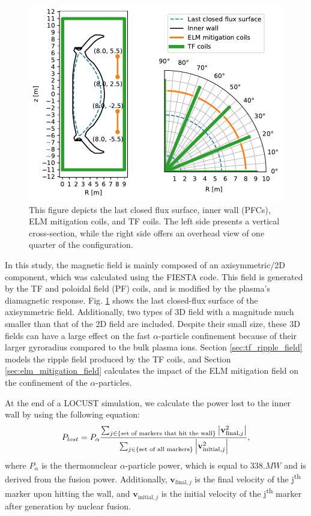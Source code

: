 \documentclass[10pt, a4paper, twoside]{article}
\begin{document}
\begin{figure}[!htb]
    \centering
    \includegraphics[width=0.6\linewidth]{Figures/lcfs_wall_elm_tf_coils.pdf}
    \caption{This figure depicts the last closed flux surface, inner wall (PFCs), ELM mitigation coils, and TF coils. The left side presents a vertical cross-section, while the right side offers an overhead view of one quarter of the configuration.}
    \label{fig:lcfs_wall_elm_tf_coils}
\end{figure}

In this study, the magnetic field is mainly composed of an axisymmetric/2D component, which was calculated using the FIESTA code. This field is generated by the TF and poloidal field (PF) coils, and is modified by the plasma's diamagnetic response. Fig. \ref{fig:lcfs_wall_elm_tf_coils} shows the last closed-flux surface of the axisymmetric field. Additionally, two types of 3D field with a magnitude much smaller than that of the 2D field are included. Despite their small size, these 3D fields can have a large effect on the fast $\alpha$-particle confinement because of their larger gyroradius compared to the bulk plasma ions. Section \ref{sec:tf_ripple_field} models the ripple field produced by the TF coils, and Section \ref{sec:elm_mitigation_field} calculates the impact of the ELM mitigation field on the confinement of the $\alpha$-particles.

At the end of a LOCUST simulation, we calculate the power lost to the inner wall by using the following equation: 
\begin{equation} 
P_{lost} = P_\alpha \frac{\sum_{j\in \text{\{set of markers that hit the wall\}}}\abs{\textbf{v}_{\text{final}, j}^2}}{\sum_{j \in \{\text{set of all markers}\}} \abs{\mathbf{v}_{\text{initial}, j}^2 }}, 
\end{equation}
where $P_\alpha$ is the thermonuclear $\alpha$-particle power, which is equal to $\si{338.MW}$ and is derived from the fusion power. Additionally, $\mathbf{v}_{\text{final}, j}$ is the final velocity of the j\textsuperscript{th} marker upon hitting the wall, and $\mathbf{v}_{\text{initial}, j}$ is the initial velocity of the j\textsuperscript{th} marker after generation by nuclear fusion.
\end{document}
